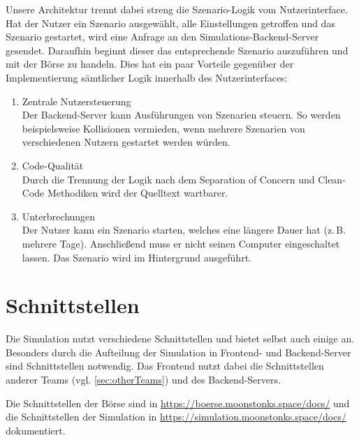 Unsere Architektur trennt dabei streng die Szenario-Logik vom Nutzerinterface.
Hat der Nutzer ein Szenario ausgewählt, alle Einstellungen getroffen und das Szenario gestartet, wird eine Anfrage an den Simulations-Backend-Server gesendet. Daraufhin beginnt dieser das entsprechende Szenario auszuführen und mit der Börse zu handeln.
Dies hat ein paar Vorteile gegenüber der Implementierung sämtlicher Logik innerhalb des Nutzerinterfaces:
\begin{enumerate}
    \item Zentrale Nutzersteuerung\\
        Der Backend-Server kann Ausführungen von Szenarien steuern. So werden beispielsweise Kollisionen vermieden, wenn mehrere Szenarien von verschiedenen Nutzern gestartet werden würden.
    \item Code-Qualität\\
        Durch die Trennung der Logik nach dem Separation of Concern und Clean-Code Methodiken wird der Quelltext wartbarer.
    \item Unterbrechungen\\
        Der Nutzer kann ein Szenario starten, welches eine längere Dauer hat (z.\,B. mehrere Tage). Anschließend muss er nicht seinen Computer eingeschaltet lassen. Das Szenario wird im Hintergrund ausgeführt.
\end{enumerate}

\section{Schnittstellen}
Die Simulation nutzt verschiedene Schnittstellen und bietet selbst auch einige an. Besonders durch die Aufteilung der Simulation in Frontend- und Backend-Server sind Schnittstellen notwendig.
Das Frontend nutzt dabei die Schnittstellen anderer Teams (vgl. \autoref{sec:otherTeams}) und des Backend-Servers.

Die Schnittstellen der Börse sind in \href{https://boerse.moonstonks.space/docs/}{https://boerse.moonstonks.space/docs/} und die Schnittstellen der Simulation in \href{https://simulation.moonstonks.space/docs/}{https://simulation.moonstonks.space/docs/} dokumentiert.

